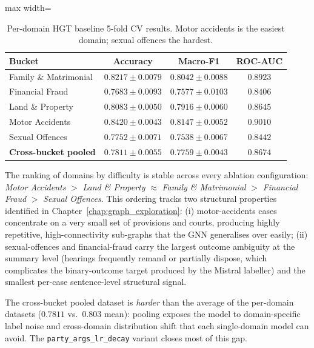\begin{table}[H]
  \centering
  \small
  \begin{adjustbox}{max width=\textwidth}
  \begin{tabular}{lccc}
    \toprule
    Bucket & Accuracy & Macro-F1 & ROC-AUC \\
    \midrule
    Family \& Matrimonial & $0.8217\pm0.0079$ & $0.8042\pm0.0088$ & $0.8923$ \\
    Financial Fraud      & $0.7683\pm0.0093$ & $0.7577\pm0.0103$ & $0.8406$ \\
    Land \& Property     & $0.8083\pm0.0050$ & $0.7916\pm0.0060$ & $0.8645$ \\
    Motor Accidents      & $0.8420\pm0.0043$ & $0.8147\pm0.0052$ & $0.9010$ \\
    Sexual Offences      & $0.7752\pm0.0071$ & $0.7538\pm0.0067$ & $0.8442$ \\
    \midrule
    \textbf{Cross-bucket pooled} & $0.7811\pm0.0055$ & $0.7759\pm0.0043$ & $0.8674$ \\
    \bottomrule
  \end{tabular}
  \end{adjustbox}
  \caption{Per-domain HGT baseline 5-fold CV results. Motor accidents
  is the easiest domain; sexual offences the hardest.}
  \label{tab:per_domain}
\end{table}

The ranking of domains by difficulty is stable across every ablation
configuration: \textit{Motor Accidents} $>$ \textit{Land \& Property}
$\approx$ \textit{Family \& Matrimonial} $>$ \textit{Financial Fraud}
$>$ \textit{Sexual Offences}. This ordering tracks two structural
properties identified in
Chapter~\ref{chap:graph_exploration}: (i) motor-accidents cases
concentrate on a very small set of provisions and courts, producing
highly repetitive, high-connectivity sub-graphs that the GNN
generalises over easily; (ii) sexual-offences and financial-fraud
carry the largest outcome ambiguity at the summary level (hearings
frequently remand or partially dispose, which complicates the
binary-outcome target produced by the Mistral labeller) and the
smallest per-case sentence-level structural signal.

The cross-bucket pooled dataset is \emph{harder} than the average of
the per-domain datasets ($0.7811$ vs.\ $0.803$ mean): pooling exposes
the model to domain-specific label noise and cross-domain distribution
shift that each single-domain model can avoid. The
\texttt{party\_args\_lr\_decay} variant closes most of this gap.

